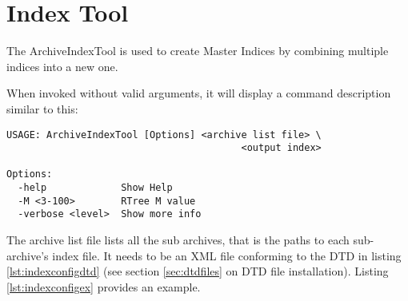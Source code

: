 \section{Index Tool} \label{sec:indextool}
The ArchiveIndexTool is used to create Master Indices by combining
multiple indices into a new one.

When invoked without valid arguments, it will display a command
description similar to this:

\begin{lstlisting}[frame=none,keywordstyle=\sffamily]
USAGE: ArchiveIndexTool [Options] <archive list file> \
                                         <output index>
 
Options:
  -help             Show Help
  -M <3-100>        RTree M value
  -verbose <level>  Show more info
\end{lstlisting}

\noindent The archive list file lists all the sub archives,
that is the paths to each sub-archive's index file. It needs to be an
XML file conforming to the DTD in listing \ref{lst:indexconfigdtd}
(see section \ref{sec:dtdfiles} on DTD file installation).
Listing \ref{lst:indexconfigex} provides an example.



